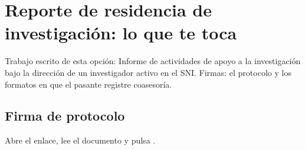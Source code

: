 \section{Reporte de residencia de investigación: lo que te toca}
Trabajo escrito de esta opción: Informe de actividades de apoyo a la investigación bajo la dirección de un investigador activo en el SNI. Firmas: el protocolo y los formatos en que el pasante registre coasesoría.
\subsection{Firma de protocolo}
Abre el enlace, lee el documento y pulsa .
